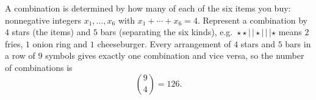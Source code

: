 A combination is determined by how many of each of the six items you buy: nonnegative integers $x_1,\dots,x_6$ with $x_1+\cdots+x_6=4$. Represent a combination by $4$ stars (the items) and $5$ bars (separating the six kinds), e.g.\ $\star\star|\,|\star|\,|\,|\star$ means $2$ fries, $1$ onion ring and $1$ cheeseburger. Every arrangement of $4$ stars and $5$ bars in a row of $9$ symbols gives exactly one combination and vice versa, so the number of combinations is
\[
\binom{9}{4}=\boxed{126}.
\]
